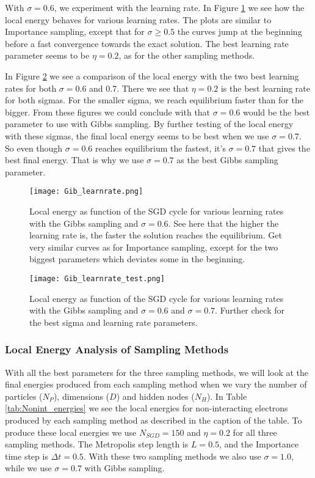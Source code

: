 \documentclass[12pt,a4paper,english]{article}
\begin{document}
\newpage
With $\sigma=0.6$, we experiment with the learning rate. In Figure \ref{fig:check_learnrate_Gib} we see how the local energy behaves for various learning rates. The plots are similar to Importance sampling, except that for $\sigma\geq0.5$ the curves jump at the beginning before a fast convergence towards the exact solution. The best learning rate parameter seems to be $\eta=0.2$, as for the other sampling methods. 

In Figure \ref{fig:check_learnrates_Gib} we see a comparison of the local energy with the two best learning rates for both $\sigma=0.6$ and 0.7. There we see that $\eta=0.2$ is the best learning rate for both sigmas. For the smaller sigma, we reach equilibrium faster than for the bigger. From these figures we could conclude with that $\sigma=0.6$ would be the best parameter to use with Gibbs sampling. By further testing of the local energy with these sigmas, the final local energy seems to be best when we use $\sigma=0.7$. So even though $\sigma=0.6$ reaches equilibrium the fastest, it's $\sigma=0.7$ that gives the best final energy. That is why we use $\sigma=0.7$ as the best Gibbs sampling parameter.

\begin{figure}[htbp!]
	\centering\texttt{[image: Gib\_learnrate.png]}
	\caption{Local energy as function of the SGD cycle for various learning rates with the Gibbs sampling and $\sigma=0.6$. See here that the higher the learning rate is, the faster the solution reaches the equilibrium. Get very similar curves as for Importance sampling, except for the two biggest parameters which deviates some in the beginning. \label{fig:check_learnrate_Gib}}
\end{figure} 

\begin{figure}[htbp!]
	\centering\texttt{[image: Gib\_learnrate\_test.png]}
	\caption{Local energy as function of the SGD cycle for various learning rates with the Gibbs sampling and $\sigma=0.6$ and $\sigma=0.7$. Further check for the best sigma  and learning rate parameters. \label{fig:check_learnrates_Gib}}
\end{figure} 

\newpage
\subsubsection{Local Energy Analysis of Sampling Methods}
\label{subsubsect:Results_nonint_Analysis}
With all the best parameters for the three sampling methods, we will look at the final energies produced from each sampling method when we vary the number of particles ($N_P$), dimensions ($D$) and hidden nodes ($N_H$). In Table \ref{tab:Nonint_energies} we see the local energies for non-interacting electrons produced by each sampling method as described in the caption of the table. To produce these local energies we use $N_{SGD}=150$ and $\eta=0.2$ for all three sampling methods. The Metropolis step length is $L=0.5$, and the Importance time step is $\Delta t=0.5$. With these two sampling methods we also use $\sigma=1.0$, while we use $\sigma=0.7$ with Gibbs sampling.
\end{document}

